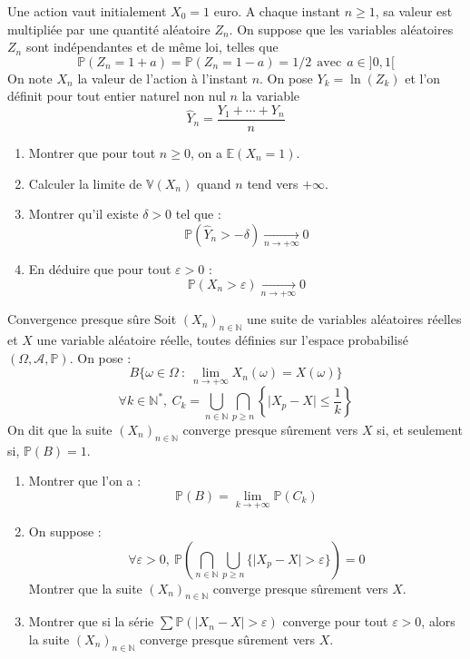 \documentclass[french,a4paper]{article}
\renewcommand{\P}{\mathbb{P}}
\newcommand{\N}{\mathbb{N}}
\newcommand{\st}{^*}
\newcommand{\E}{\mathbb{E}}
\newcommand{\V}{\mathbb{V}}
\theoremstyle{plain}
\theoremstyle{definition}
\theoremstyle{remark}
\begin{document}
\begin{ex}[Moulin.76]{}
	Une action vaut initialement $X_0=1$ euro. A chaque instant $n\geqslant 1$, sa valeur est multipliée par une quantité aléatoire $Z_n$. On suppose que les variables aléatoires $Z_n$ sont indépendantes et de même loi, telles que $$\P(Z_n=1+a)=\P(Z_n=1-a)=1/2\ \ \text{avec}\ \ a\in]0,1[$$ On note $X_n$ la valeur de l'action à l'instant $n$. On pose $Y_k=\ln(Z_k)$ et l'on définit pour tout entier naturel non nul $n$ la variable $$\hat{Y}_n=\frac{Y_1+\cdots+Y_n}{n}$$
	\begin{enumerate}
		\item Montrer que pour tout $n\geqslant0$, on a $\E(X_n=1)$.
		\item Calculer la limite de $\V(X_n)$ quand $n$ tend vers $+\infty$.
		\item Montrer qu'il existe $\delta>0$ tel que : $$\P\left(\hat{Y}_n>-\delta\right)\xrightarrow[n\to+\infty]{}0$$
		\item En déduire que pour tout $\varepsilon>0$ : $$\P(X_n>\varepsilon)\xrightarrow[n\to+\infty]{}0$$
	\end{enumerate}
\end{ex}

\begin{ex}[Moulin.77]{Convergence presque sûre}
	Soit $(X_n)_{n\in\N}$ une suite de variables aléatoires réelles et $X$ une variable aléatoire réelle, toutes définies sur l'espace probabilisé $(\Omega,\mathcal{A},\P)$. On pose : $$B\{\omega\in\Omega\ : \ \underset{n\to+\infty}{\lim}X_n(\omega)=X(\omega)\}$$ $$\forall k\in\N\st,\ C_k=\bigcup_{n\in\N}\bigcap_{p\geqslant n}\left\{\lvert X_p-X\rvert\leqslant\frac{1}{k}\right\}$$ On dit que la suite $(X_n)_{n\in\N}$ converge presque sûrement vers $X$ si, et seulement si, $\P(B)=1$.
	\begin{enumerate}
		\item Montrer que l'on a : $$\P(B)=\underset{k\to+\infty}{\lim}\P(C_k)$$
		\item On suppose : $$\forall \varepsilon>0,\ \P\left(\bigcap_{n\in\N}\bigcup_{p\geqslant n}\{\lvert X_p-X\rvert>\varepsilon\}\right)=0$$ Montrer que la suite $(X_n)_{n\in\N}$ converge presque sûrement vers $X$.
		\item Montrer que si la série $\displaystyle\sum\P(\lvert X_n-X\rvert>\varepsilon)$ converge pour tout $\varepsilon>0$, alors la suite $(X_n)_{n\in\N}$ converge presque sûrement vers $X$.
	\end{enumerate}
\end{ex}
\end{document}
